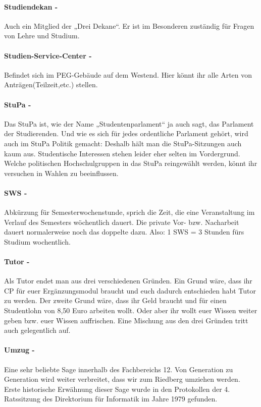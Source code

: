 \paragraph{Studiendekan -} Auch ein Mitglied der „Drei Dekane“. Er ist im Besonderen zuständig für Fragen von Lehre und Studium.
\paragraph{Studien-Service-Center -} Befindet sich im PEG-Gebäude auf dem Westend. Hier könnt ihr alle Arten von Anträgen(Teilzeit,etc.) stellen.
\paragraph{StuPa -} Das StuPa ist, wie der Name „Studentenparlament“ ja auch sagt, das Parlament der Studierenden. Und wie es sich für jedes ordentliche Parlament gehört, wird auch im StuPa Politik gemacht: Deshalb hält man die StuPa-Sitzungen auch kaum aus. Studentische Interessen stehen leider eher selten im Vordergrund. Welche politischen Hochschulgruppen in das StuPa reingewählt werden, könnt ihr versuchen in Wahlen zu beeinflussen.
\paragraph{SWS -} Abkürzung für Semesterwochenstunde, sprich die Zeit, die eine Veranstaltung im Verlauf des Semesters wöchentlich dauert. Die private Vor- bzw. Nacharbeit dauert normalerweise noch das doppelte dazu. Also: 1 SWS = 3 Stunden fürs Studium wochentlich.
\paragraph{Tutor -} Als Tutor endet man aus drei verschiedenen Gründen. Ein Grund wäre, dass ihr CP für euer Ergänzungsmodul braucht und euch dadurch entschieden habt Tutor zu werden. Der zweite Grund wäre, dass ihr Geld braucht und für einen Studentlohn von 8,50 Euro arbeiten wollt. Oder aber ihr wollt euer Wissen weiter geben bzw. euer Wissen auffrischen. Eine Mischung aus den drei Gründen tritt auch gelegentlich auf.
\paragraph{Umzug -} Eine sehr beliebte Sage innerhalb des Fachbereichs 12. Von Generation zu Generation wird weiter verbreitet, dass wir zum Riedberg umziehen werden. Erste historische Erwähnung dieser Sage wurde in den Protokollen der 4. Ratssitzung des Direktorium für Informatik im Jahre 1979 gefunden.
